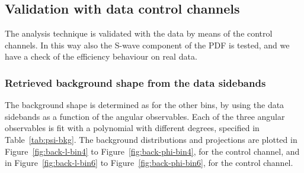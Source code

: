 


\subsection{Validation with data control channels}
\label{sec:controlchannel}

The analysis technique is validated with the data by means of the control channels.
In this way also the S-wave component of the PDF is tested, and we have a check of the efficiency behaviour on real data.

\subsubsection{ Retrieved background shape from the data sidebands}
\label{sec:bkgforcc}

The background shape is determined as for the other bins, by using the data sidebands as a function of the angular observables.
Each of the three angular observables is fit with a polynomial with different degrees, specified in Table~\ref{tab:psi-bkg}.
The background distributions and \pdf projections are plotted in Figure~\ref{fig:back-l-bin4} to Figure~\ref{fig:back-phi-bin4}, for the \BtoKstJpsi control channel, and in Figure~\ref{fig:back-l-bin6} to Figure~\ref{fig:back-phi-bin6}, for the \BtoKstpsip control channel.

